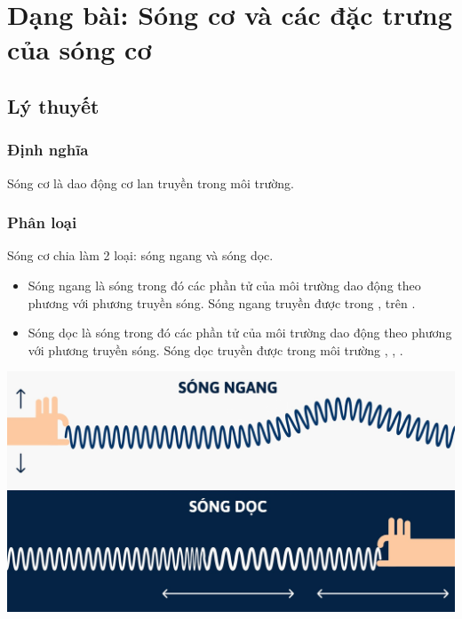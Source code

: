 
\chapter[Dạng bài: Sóng cơ và các đặc trưng của sóng cơ]{Dạng bài: Sóng cơ và các đặc trưng của sóng cơ}
\section{Lý thuyết}
\subsection{Định nghĩa}

Sóng cơ là dao động cơ lan truyền trong môi trường.
\subsection{Phân loại}
Sóng cơ chia làm 2 loại: sóng ngang và sóng dọc.
\begin{itemize}
	\item Sóng ngang là sóng trong đó các phần tử của môi trường dao động theo phương  với phương truyền sóng. Sóng ngang truyền được trong , trên .
	\item Sóng dọc là sóng trong đó các phần tử của môi trường dao động theo phương  với phương truyền sóng. Sóng dọc truyền được trong môi trường , , .
\end{itemize}
\begin{center}
	\includegraphics[scale=0.3]{../figs/VN12-PH-10-L-005-1-V2-1.jpg}
\end{center}

